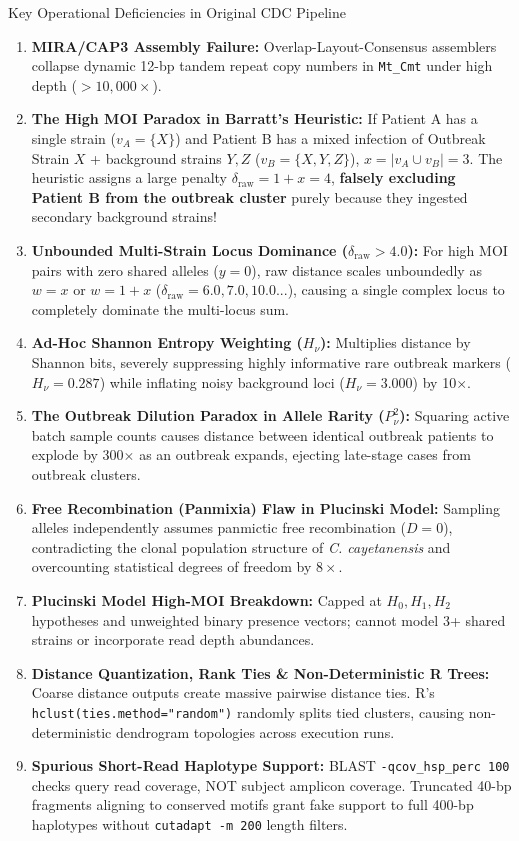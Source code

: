 \documentclass[11pt,a4paper]{article}
\begin{document}
\begin{warningbox}{Key Operational Deficiencies in Original CDC Pipeline}
\begin{enumerate}[leftmargin=*]
    \item \textbf{MIRA/CAP3 Assembly Failure:} Overlap-Layout-Consensus assemblers collapse dynamic 12-bp tandem repeat copy numbers in \texttt{Mt\_Cmt} under high depth ($>10,000\times$).
    \item \textbf{The High MOI Paradox in Barratt's Heuristic:} If Patient A has a single strain ($v_A = \{X\}$) and Patient B has a mixed infection of Outbreak Strain $X$ + background strains $Y, Z$ ($v_B = \{X, Y, Z\}$), $x = |v_A \cup v_B| = 3$. The heuristic assigns a large penalty $\delta_{\text{raw}} = 1 + x = 4$, \textbf{falsely excluding Patient B from the outbreak cluster} purely because they ingested secondary background strains!
    \item \textbf{Unbounded Multi-Strain Locus Dominance ($\delta_{\text{raw}} > 4.0$):} For high MOI pairs with zero shared alleles ($y = 0$), raw distance scales unboundedly as $w = x$ or $w = 1+x$ ($\delta_{\text{raw}} = 6.0, 7.0, 10.0...$), causing a single complex locus to completely dominate the multi-locus sum.
    \item \textbf{Ad-Hoc Shannon Entropy Weighting ($H_\nu$):} Multiplies distance by Shannon bits, severely suppressing highly informative rare outbreak markers ($H_\nu = 0.287$) while inflating noisy background loci ($H_\nu = 3.000$) by 10$\times$.
    \item \textbf{The Outbreak Dilution Paradox in Allele Rarity ($P_\nu^2$):} Squaring active batch sample counts causes distance between identical outbreak patients to explode by 300$\times$ as an outbreak expands, ejecting late-stage cases from outbreak clusters.
    \item \textbf{Free Recombination (Panmixia) Flaw in Plucinski Model:} Sampling alleles independently assumes panmictic free recombination ($D=0$), contradicting the clonal population structure of \textit{C. cayetanensis} and overcounting statistical degrees of freedom by $8\times$.
    \item \textbf{Plucinski Model High-MOI Breakdown:} Capped at $H_0, H_1, H_2$ hypotheses and unweighted binary presence vectors; cannot model 3+ shared strains or incorporate read depth abundances.
    \item \textbf{Distance Quantization, Rank Ties \& Non-Deterministic R Trees:} Coarse distance outputs create massive pairwise distance ties. R's \texttt{hclust(ties.method="random")} randomly splits tied clusters, causing non-deterministic dendrogram topologies across execution runs.
    \item \textbf{Spurious Short-Read Haplotype Support:} BLAST \texttt{-qcov\_hsp\_perc 100} checks query read coverage, NOT subject amplicon coverage. Truncated 40-bp fragments aligning to conserved motifs grant fake support to full 400-bp haplotypes without \texttt{cutadapt -m 200} length filters.
\end{enumerate}
\end{warningbox}
\end{document}
